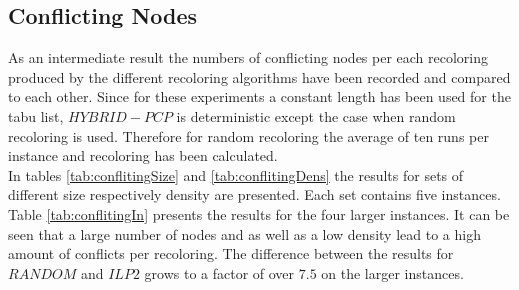 \subsection{Conflicting Nodes}
As an intermediate result the numbers of conflicting nodes per each recoloring produced by the different recoloring algorithms have been recorded and compared to each other. Since for these experiments a constant length has been used for the tabu list, $HYBRID-PCP$ is deterministic except the case when random recoloring is used. Therefore for random recoloring the average of ten runs per instance and recoloring has been calculated.\\
In tables \ref{tab:conflitingSize} and \ref{tab:conflitingDens} the results for sets of different size respectively density are presented. Each set contains five instances. Table \ref{tab:conflitingIn} presents the results for the four larger instances. It can be seen that a large number of nodes and as well as a low density lead to a high amount of conflicts per recoloring. The difference between the results for $RANDOM$ and $ILP2$ grows to a factor of over $7.5$ on the larger instances.
\begin{table}[h]
\caption{Sets of different size containing five instances each. $cnodes/recoloring$ denotes the average amount of conflicting nodes per recoloring.}
\label{tab:conflitingSize}
\end{table}
